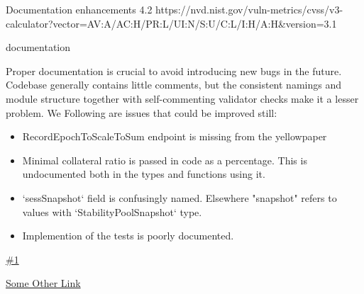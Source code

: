 \vuln
    { %
      Documentation enhancements
    }
    { %
      4.2
    }
    { %
      https://nvd.nist.gov/vuln-metrics/cvss/v3-calculator?vector=AV:A/AC:H/PR:L/UI:N/S:U/C:L/I:H/A:H&version=3.1
    }
    { %
    \item documentation
    }
    { %
    Proper documentation is crucial to avoid introducing new bugs in the future.
Codebase generally contains little comments, but the consistent namings and module structure together with self-commenting validator checks make it a lesser problem.
We  
Following are issues that could be improved still:
\begin{itemize}
    \item RecordEpochToScaleToSum endpoint is missing from the yellowpaper
    \item Minimal collateral ratio is passed in code as a percentage. This is undocumented both in the types and functions using it.
    \item `sessSnapshot` field is confusingly named. Elsewhere "snapshot" refers to values with `StabilityPoolSnapshot` type.
    \item Implemention of the tests is poorly documented.
  \end{itemize}
  
    }
    { %
      
    }
    { %
    \item\href{github.com}{\#1}
    \item\href{github.com}{Some Other Link}
    }
